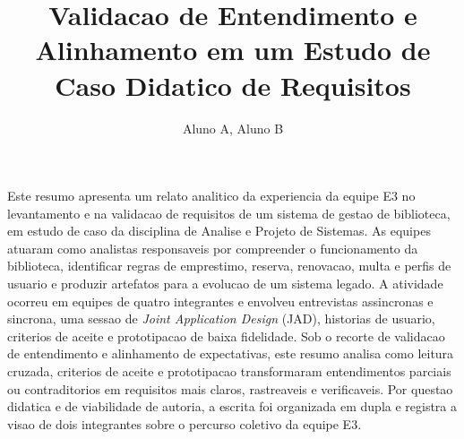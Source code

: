 \documentclass[12pt]{article}
\title{Validacao de Entendimento e Alinhamento em um Estudo de Caso Didatico de Requisitos}
\author{Aluno A\inst{1}, Aluno B\inst{1}}
\begin{document}
\maketitle

%
%
Este resumo apresenta um relato analitico da experiencia da equipe E3 no levantamento e na validacao de requisitos de um sistema de gestao de biblioteca, em estudo de caso da disciplina de Analise e Projeto de Sistemas. As equipes atuaram como analistas responsaveis por compreender o funcionamento da biblioteca, identificar regras de emprestimo, reserva, renovacao, multa e perfis de usuario e produzir artefatos para a evolucao de um sistema legado. A atividade ocorreu em equipes de quatro integrantes e envolveu entrevistas assincronas e sincrona, uma sessao de \textit{Joint Application Design} (JAD), historias de usuario, criterios de aceite e prototipacao de baixa fidelidade. Sob o recorte de validacao de entendimento e alinhamento de expectativas, este resumo analisa como leitura cruzada, criterios de aceite e prototipacao transformaram entendimentos parciais ou contraditorios em requisitos mais claros, rastreaveis e verificaveis. Por questao didatica e de viabilidade de autoria, a escrita foi organizada em dupla e registra a visao de dois integrantes sobre o percurso coletivo da equipe E3.
\end{document}
